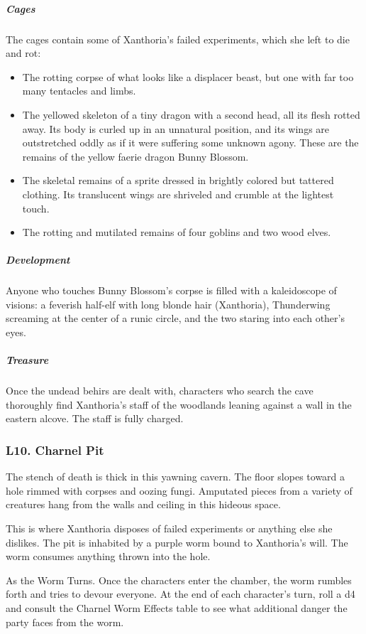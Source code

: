 \documentclass[10pt,a4paper,twoside,bg=print,twocolumn,openany,nodeprecatedcode]{dndbook}
\begin{document}
\subparagraph{Cages}
The cages contain some of Xanthoria's failed experiments, which she left to die and rot:


\begin{itemize}
\item The rotting corpse of what looks like a displacer beast, but one with far too many tentacles and limbs.
\item The yellowed skeleton of a tiny dragon with a second head, all its flesh rotted away. Its body is curled up in an unnatural position, and its wings are outstretched oddly as if it were suffering some unknown agony. These are the remains of the yellow faerie dragon Bunny Blossom.
\item The skeletal remains of a sprite dressed in brightly colored but tattered clothing. Its translucent wings are shriveled and crumble at the lightest touch.
\item The rotting and mutilated remains of four goblins and two wood elves.
\end{itemize}

\subparagraph{Development}
Anyone who touches Bunny Blossom's corpse is filled with a kaleidoscope of visions: a feverish half-elf with long blonde hair (Xanthoria), Thunderwing screaming at the center of a runic circle, and the two staring into each other's eyes.

\subparagraph{Treasure}
Once the undead behirs are dealt with, characters who search the cave thoroughly find Xanthoria's staff of the woodlands leaning against a wall in the eastern alcove. The staff is fully charged.

\subsubsection{L10. Charnel Pit}
\begin{DndReadAloud}{}
The stench of death is thick in this yawning cavern. The floor slopes toward a hole rimmed with corpses and oozing fungi. Amputated pieces from a variety of creatures hang from the walls and ceiling in this hideous space.

\end{DndReadAloud}

This is where Xanthoria disposes of failed experiments or anything else she dislikes. The pit is inhabited by a purple worm bound to Xanthoria's will. The worm consumes anything thrown into the hole.

As the Worm Turns. Once the characters enter the chamber, the worm rumbles forth and tries to devour everyone. At the end of each character's turn, roll a d4 and consult the Charnel Worm Effects table to see what additional danger the party faces from the worm.
\end{document}
